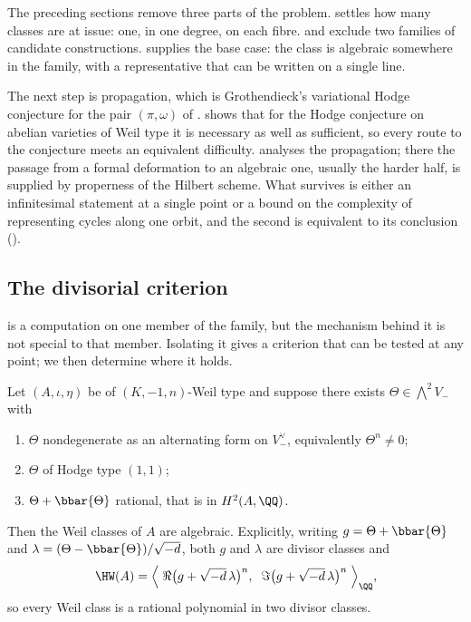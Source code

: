 \begin{remark}\label{rem:target}
The preceding sections remove three parts of the problem.
 settles how many classes are at issue: one, in one
degree, on each fibre.  and  exclude
two families of candidate constructions.  supplies the
base case: the class is algebraic somewhere in the family, with a
representative that can be written on a single line.

The next step is propagation, which is Grothendieck's variational Hodge
conjecture for the pair $(\pi,\omega)$ of .
 shows that for the Hodge conjecture on
abelian varieties of Weil type it is necessary as well as sufficient, so every
route to the conjecture meets an equivalent difficulty.
 analyses the propagation; there the passage from a
formal deformation to an algebraic one, usually the harder half, is supplied
by properness of the Hilbert scheme. What survives is either an infinitesimal
statement at a single point or a bound on the complexity of representing
cycles along one orbit, and the second is equivalent to its conclusion
().
\end{remark}

\subsection{The divisorial criterion}
\label{ssec:divcrit}

 is a computation on one member of the family, but the
mechanism behind it is not special to that member. Isolating it gives a
criterion that can be tested at any point; we then determine where it holds.

\begin{theorem}\label{thm:divcriterion}
Let $(A,\iota,\eta)$ be of $(K,-1,n)$-Weil type and suppose there exists
$\Theta\in\bigwedge^{2}V_{-}$ with
\begin{enumerate}[label=\textup{(\roman*)},nosep]
\item $\Theta$ nondegenerate as an alternating form on $V_{-}^{\vee}$,
  equivalently $\Theta^{n}\ne0$;
\item $\Theta$ of Hodge type $(1,1)$;
\item $\Theta+\bbar{\Theta}$ rational, that is in $H^{2}(A,\QQ)$.
\end{enumerate}
Then the Weil classes of $A$ are algebraic. Explicitly, writing
$g=\Theta+\bbar{\Theta}$ and $\lambda=(\Theta-\bbar{\Theta})/\sqrt{-d}$, both
$g$ and $\lambda$ are divisor classes and
\begin{equation}\label{eq:divrep}
  \HW(A)=\Bigl\langle\;
    \Re\bigl(g+\sqrt{-d}\,\lambda\bigr)^{n},\;\;
    \Im\bigl(g+\sqrt{-d}\,\lambda\bigr)^{n}\;\Bigr\rangle_{\QQ},
\end{equation}
so every Weil class is a rational polynomial in two divisor classes.
\end{theorem}

